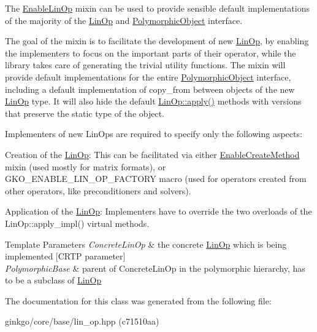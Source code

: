 The \hyperlink{classgko_1_1EnableLinOp}{Enable\+Lin\+Op} mixin can be used to provide sensible default implementations of the majority of the \hyperlink{classgko_1_1LinOp}{Lin\+Op} and \hyperlink{classgko_1_1PolymorphicObject}{Polymorphic\+Object} interface. 

The goal of the mixin is to facilitate the development of new \hyperlink{classgko_1_1LinOp}{Lin\+Op}, by enabling the implementers to focus on the important parts of their operator, while the library takes care of generating the trivial utility functions. The mixin will provide default implementations for the entire \hyperlink{classgko_1_1PolymorphicObject}{Polymorphic\+Object} interface, including a default implementation of {\ttfamily copy\+\_\+from} between objects of the new \hyperlink{classgko_1_1LinOp}{Lin\+Op} type. It will also hide the default \hyperlink{classgko_1_1LinOp_a0449b2fc705d2f970855af23b5e2788e}{Lin\+Op\+::apply()} methods with versions that preserve the static type of the object.

Implementers of new Lin\+Ops are required to specify only the following aspects\+:


\begin{DoxyEnumerate}
\item Creation of the \hyperlink{classgko_1_1LinOp}{Lin\+Op}\+: This can be facilitated via either \hyperlink{classgko_1_1EnableCreateMethod}{Enable\+Create\+Method} mixin (used mostly for matrix formats), or G\+K\+O\+\_\+\+E\+N\+A\+B\+L\+E\+\_\+\+L\+I\+N\+\_\+\+O\+P\+\_\+\+F\+A\+C\+T\+O\+RY macro (used for operators created from other operators, like preconditioners and solvers).
\item Application of the \hyperlink{classgko_1_1LinOp}{Lin\+Op}\+: Implementers have to override the two overloads of the Lin\+Op\+::apply\+\_\+impl() virtual methods.
\end{DoxyEnumerate}


\begin{DoxyTemplParams}{Template Parameters}
{\em Concrete\+Lin\+Op} & the concrete \hyperlink{classgko_1_1LinOp}{Lin\+Op} which is being implemented \mbox{[}C\+R\+TP parameter\mbox{]} \\
\hline
{\em Polymorphic\+Base} & parent of Concrete\+Lin\+Op in the polymorphic hierarchy, has to be a subclass of \hyperlink{classgko_1_1LinOp}{Lin\+Op} \\
\hline
\end{DoxyTemplParams}


The documentation for this class was generated from the following file\+:\begin{DoxyCompactItemize}
\item 
ginkgo/core/base/lin\+\_\+op.\+hpp (c71510aa)\end{DoxyCompactItemize}
